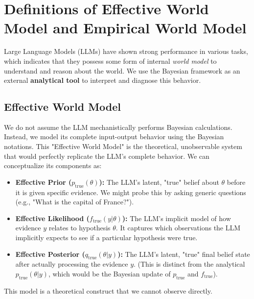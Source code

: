 \documentclass{article}
\theoremstyle{definition}
\begin{document}

\section{Definitions of Effective World Model and Empirical World Model}

Large Language Models (LLMs) have shown strong performance in various tasks, which indicates that they possess some form of internal \textit{world model} to understand and reason about the world. We use the Bayesian framework as an external \textbf{analytical tool} to interpret and diagnose this behavior.

\subsection{Effective World Model}
We do not assume the LLM mechanistically performs Bayesian calculations. Instead, we model its complete input-output behavior using the Bayesian notations. This "Effective World Model" is the theoretical, unobservable system that would perfectly replicate the LLM's complete behavior. We can conceptualize its components as:

\begin{itemize}
    \item \textbf{Effective Prior ($p_{\text{true}}(\theta)$):} The LLM's latent, "true" belief about $\theta$ before it is given specific evidence. We might probe this by asking generic questions (e.g., "What is the capital of France?").
    \item \textbf{Effective Likelihood ($f_{\text{true}}(y|\theta)$):} The LLM's implicit model of how evidence $y$ relates to hypothesis $\theta$. It captures which observations the LLM implicitly expects to see if a particular hypothesis were true.
    \item \textbf{Effective Posterior ($q_{\text{true}}(\theta|y)$):} The LLM's latent, "true" final belief state after actually processing the evidence $y$. (This is distinct from the analytical $p_{\text{true}}(\theta|y)$, which would be the Bayesian update of $p_{\text{true}}$ and $f_{\text{true}}$).
\end{itemize}
This model is a theoretical construct that we cannot observe directly.
\end{document}
